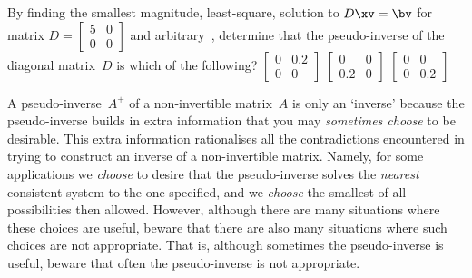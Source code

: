 \begin{activity}
By finding the smallest magnitude, least-square, solution to \(D\xv=\bv\) for matrix \(D=\begin{bmatrix} 5&0\\0&0 \end{bmatrix}\) and arbitrary~\bv, determine that the pseudo-inverse of the diagonal matrix~\(D\) is which of the following?
{\(\begin{bmatrix} 0&0.2\\0&0 \end{bmatrix}\)}
{\(\begin{bmatrix} 0&0\\0.2&0 \end{bmatrix}\)}
{\(\begin{bmatrix} 0&0\\0&0.2 \end{bmatrix}\)}
\end{activity}




A pseudo-inverse~\(A^+\) of a non-invertible matrix~\(A\) is only an `inverse' because the pseudo-inverse builds in extra information that you may \emph{sometimes choose} to be desirable.
This extra information rationalises all the contradictions encountered in trying to construct an inverse of a non-invertible matrix.  
Namely, for some applications we \emph{choose} to desire that the pseudo-inverse solves the \emph{nearest} consistent system to the one specified, and we \emph{choose} the smallest of all possibilities then allowed.
However, although there are many situations where these choices are useful, beware that there are also many situations where such choices are not appropriate.
That is, although sometimes the pseudo-inverse is useful, beware that often the pseudo-inverse is not appropriate.


